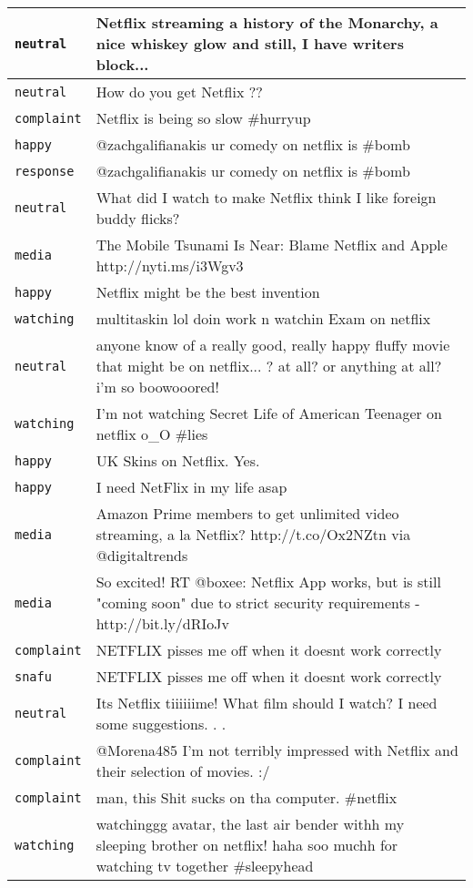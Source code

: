 {\begin{longtable}{|l|p{160mm}|}
      \tabularnewline\hline
         \texttt{neutral} & Netflix streaming a history of the Monarchy, a nice whiskey glow and still, I have writers block...
      \tabularnewline\hline
         \texttt{neutral} & How do you get Netflix ??
      \tabularnewline\hline
         \texttt{complaint} & Netflix is being so slow \#hurryup
      \tabularnewline\hline
         \texttt{happy} & @zachgalifianakis ur comedy on netflix is \#bomb
      \tabularnewline\hline
         \texttt{response} & @zachgalifianakis ur comedy on netflix is \#bomb
      \tabularnewline\hline
         \texttt{neutral} & What did I watch to make Netflix think I like foreign buddy flicks?
      \tabularnewline\hline
         \texttt{media} & The Mobile Tsunami Is Near: Blame Netflix and Apple http://nyti.ms/i3Wgv3
      \tabularnewline\hline
         \texttt{happy} & Netflix might be the best invention
      \tabularnewline\hline
         \texttt{watching} & multitaskin lol doin work n watchin Exam on netflix
      \tabularnewline\hline
         \texttt{neutral} & anyone know of a really good, really happy fluffy movie that might be on netflix... ? at all? or anything at all? i'm so boowooored!
      \tabularnewline\hline
         \texttt{watching} & I'm not watching Secret Life of American Teenager on netflix o\_O \#lies
      \tabularnewline\hline
         \texttt{happy} & UK Skins on Netflix. Yes.
      \tabularnewline\hline
         \texttt{happy} & I need NetFlix in my life asap
      \tabularnewline\hline
         \texttt{media} & Amazon Prime members to get unlimited video streaming, a la Netflix? http://t.co/Ox2NZtn via @digitaltrends
      \tabularnewline\hline
         \texttt{media} & So excited! RT @boxee: Netflix App works, but is still "coming soon" due to strict security requirements - http://bit.ly/dRIoJv
      \tabularnewline\hline
         \texttt{complaint} & NETFLIX pisses me off when it doesnt work correctly
      \tabularnewline\hline
         \texttt{snafu} & NETFLIX pisses me off when it doesnt work correctly
      \tabularnewline\hline
         \texttt{neutral} & Its Netflix tiiiiiime! What film should I watch? I need some suggestions. . .
      \tabularnewline\hline
         \texttt{complaint} & @Morena485 I'm not terribly impressed with Netflix and their selection of movies. :/
      \tabularnewline\hline
         \texttt{complaint} & man, this Shit sucks on tha computer. \#netflix
      \tabularnewline\hline
         \texttt{watching} & watchinggg avatar, the last air bender withh my sleeping brother on netflix! haha soo muchh for watching tv together \#sleepyhead

\end{longtable}}
